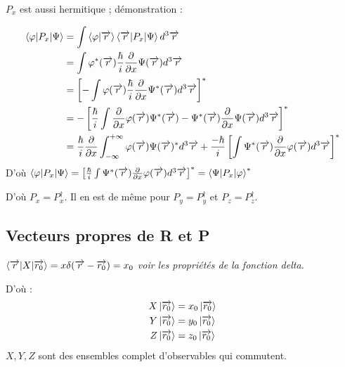 \documentclass[12pt,a4paper,titlepage]{book}
\begin{document}
$P_x$ est aussi hermitique ; démonstration :

\begin{align*}
\braket{\varphi \vert P_x \vert \Psi} &= \int \braket{\varphi \vert \overrightarrow{r}} \braket{\overrightarrow{r} \vert P_x \vert \Psi} d^3 \overrightarrow{r}\\
&= \int \varphi^* (\overrightarrow{r}) \frac{\hbar}{i} \frac{\partial}{\partial x} \Psi (\overrightarrow{r}) d^3 \overrightarrow{r}\\
&= \left[ - \int \varphi (\overrightarrow{r}) \frac{\hbar}{i} \frac{\partial}{\partial x} \Psi^* (\overrightarrow{r}) d^3 \overrightarrow{r} \right]^*\\
&= -\left[ \frac{\hbar}{i} \int \frac{\partial}{\partial x} \varphi (\overrightarrow{r}) \Psi^* (\overrightarrow{r}) - \Psi^* (\overrightarrow{r}) \frac{\partial}{\partial x} \Psi (\overrightarrow{r}) d^3 \overrightarrow{r} \right]^*\\
&= \frac{\hbar}{i} \frac{\partial}{\partial x} \int_{- \infty}^{+ \infty} \varphi (\overrightarrow{r}) \Psi (\overrightarrow{r})^* d^3 \overrightarrow{r} + \frac{-\hbar}{i} \left[ \int \Psi^* (\overrightarrow{r}) \frac{\partial}{\partial x} \varphi (\overrightarrow{r}) d^3 \overrightarrow{r} \right]^*
\end{align*}
D'où $\braket{\varphi \vert P_x \vert \Psi} = \left[ \frac{\hbar}{i} \int \Psi^* (\overrightarrow{r}) \frac{\partial}{\partial x} \varphi (\overrightarrow{r}) d^3 \overrightarrow{r} \right]^* = \braket{\Psi \vert P_x \vert \varphi}^*$

D'où $P_x = P_x^\dagger$. Il en est de même pour $P_y = P_y^\dagger$ et $P_z = P_z^\dagger$.

\subsection{Vecteurs propres de R et P}

$\braket{\overrightarrow{r} \vert X \vert \overrightarrow{r_0}} = x \delta (\overrightarrow{r} - \overrightarrow{r_0}) = x_0$ \textit{voir les propriétés de la fonction delta.}

D'où :
\begin{align*}
X \ket{\overrightarrow{r_0}} &= x_0 \ket{\overrightarrow{r_0}}\\
Y \ket{\overrightarrow{r_0}} &= y_0 \ket{\overrightarrow{r_0}}\\
Z \ket{\overrightarrow{r_0}} &= z_0 \ket{\overrightarrow{r_0}}
\end{align*}
$X,Y,Z$ sont des ensembles complet d'observables qui commutent.
\end{document}
